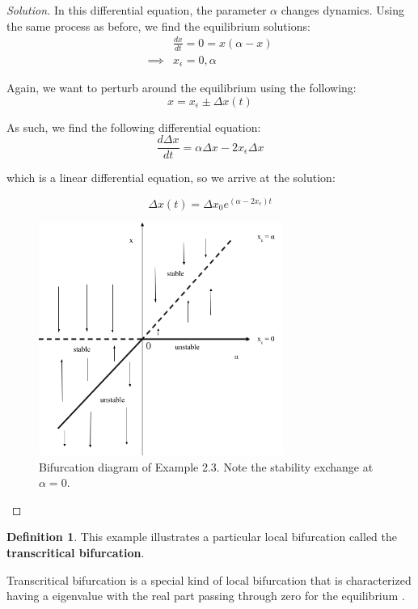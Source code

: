 \documentclass{article}
\theoremstyle{definition}
\newtheorem{definition}{Definition}[section]
\theoremstyle{remark}
\begin{document}
\begin{proof}[Solution]\renewcommand{\qedsymbol}{}
In this differential equation, the parameter $\alpha$ changes dynamics. Using the same process as before, we find the equilibrium solutions:
\begin{align}\label{equilibria 2.3}
    &\frac{dx}{dt} = 0 = 
    x(\alpha - x) \nonumber 
    \\
    \implies &x_\epsilon = \boxed{0, \alpha}
\end{align}

Again, we want to perturb around the equilibrium using the following:
\begin{equation}
    x = \boxed{x_\epsilon \pm \Delta x(t)} 
\end{equation}

As such, we find the following differential equation: 
\begin{equation}
    \frac{d\Delta x}{dt} = \alpha \Delta x -2x_\epsilon \Delta x
\end{equation}

which is a linear differential equation, so we arrive at the solution: 

\begin{equation}
    \Delta x(t) = \boxed{\Delta x_0  e^{(\alpha - 2 x_\epsilon)t}}
\end{equation}

\begin{figure}[H]
    \centering
    \includegraphics[width=80mm,scale=0.5]{images/Transcritical.png}
    \caption{Bifurcation diagram of Example 2.3. Note the stability exchange at $\alpha = 0$.}
    \label{fig:transcritical}
\end{figure}
\end{proof}

\begin{definition}
    This example illustrates a particular local bifurcation called the \textbf{transcritical bifurcation}.
\end{definition}
Transcritical  bifurcation is a special kind of local bifurcation that is characterized having a eigenvalue with the real part passing through zero for the equilibrium \cite{Roesch2019}. 
\end{document}
